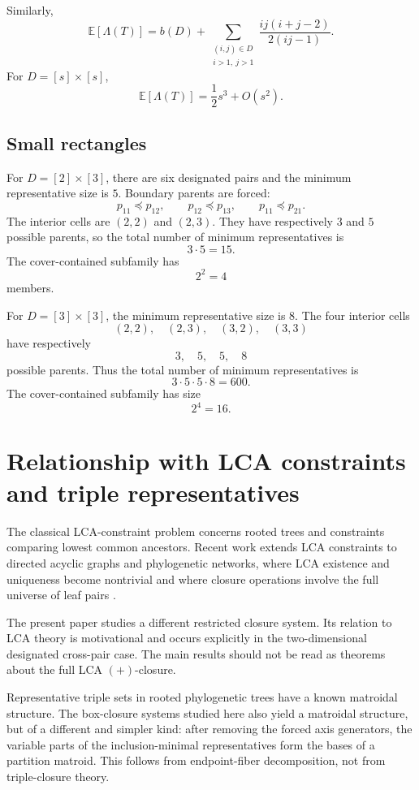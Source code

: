 \documentclass[11pt]{article}
\begin{document}
Similarly,
\[
\mathbb E[\Lambda(T)]
=
b(D)
+
\sum_{\substack{(i,j)\in D\\ i>1,\ j>1}}
\frac{ij(i+j-2)}{2(ij-1)}.
\]
For $D=[s]\times[s]$,
\[
\mathbb E[\Lambda(T)]
=
\frac12s^3+O(s^2).
\]

\subsection{Small rectangles}

For $D=[2]\times[3]$, there are six designated pairs and the minimum representative size is $5$. Boundary parents are forced:
\[
p_{11}\preceq p_{12},
\qquad
p_{12}\preceq p_{13},
\qquad
p_{11}\preceq p_{21}.
\]
The interior cells are $(2,2)$ and $(2,3)$. They have respectively $3$ and $5$ possible parents, so the total number of minimum representatives is
\[
3\cdot5=15.
\]
The cover-contained subfamily has
\[
2^2=4
\]
members.

For $D=[3]\times[3]$, the minimum representative size is $8$. The four interior cells
\[
(2,2),\quad (2,3),\quad (3,2),\quad (3,3)
\]
have respectively
\[
3,\quad5,\quad5,\quad8
\]
possible parents. Thus the total number of minimum representatives is
\[
3\cdot5\cdot5\cdot8=600.
\]
The cover-contained subfamily has size
\[
2^4=16.
\]

\section{Relationship with LCA constraints and triple representatives}

The classical LCA-constraint problem concerns rooted trees and constraints comparing lowest common ancestors. Recent work extends LCA constraints to directed acyclic graphs and phylogenetic networks, where LCA existence and uniqueness become nontrivial and where closure operations involve the full universe of leaf pairs \cite{ASSU81,EH26,HLM26,LH25,LAMSH25}.

The present paper studies a different restricted closure system. Its relation to LCA theory is motivational and occurs explicitly in the two-dimensional designated cross-pair case. The main results should not be read as theorems about the full LCA $(+)$-closure.

Representative triple sets in rooted phylogenetic trees have a known matroidal structure. The box-closure systems studied here also yield a matroidal structure, but of a different and simpler kind: after removing the forced axis generators, the variable parts of the inclusion-minimal representatives form the bases of a partition matroid. This follows from endpoint-fiber decomposition, not from triple-closure theory.
\end{document}
